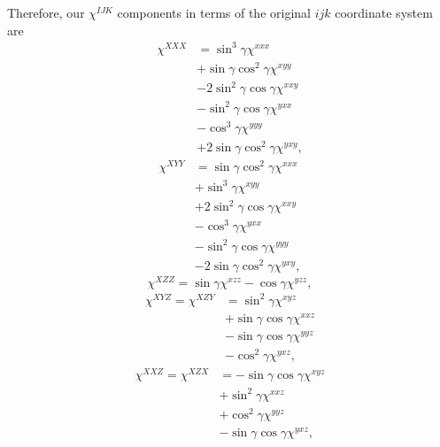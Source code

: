 \documentclass[aps,pra,10pt,amsmath,twocolumn,letterpaper]{revtex4-1}
\begin{document}
Therefore, our $\chi^{IJK}$ components in terms of the original $ijk$ coordinate
system are
\begin{equation*}
\begin{split}
\chi^{XXX} 
&=  \sin^{3}\gamma            \chi^{xxx}\\
&+  \sin\gamma \cos^{2}\gamma \chi^{xyy}\\
&- 2\sin^{2}\gamma \cos\gamma \chi^{xxy}\\
&-  \sin^{2}\gamma \cos\gamma \chi^{yxx}\\
&-  \cos^{3}\gamma            \chi^{yyy}\\
&+ 2\sin\gamma \cos^{2}\gamma \chi^{yxy},
\end{split}
\end{equation*}
\begin{equation*}
\begin{split}
\chi^{XYY} 
&=  \sin\gamma \cos^{2}\gamma \chi^{xxx}\\
&+  \sin^{3}\gamma            \chi^{xyy}\\
&+ 2\sin^{2}\gamma \cos\gamma \chi^{xxy}\\
&-  \cos^{3}\gamma            \chi^{yxx}\\
&-  \sin^{2}\gamma \cos\gamma \chi^{yyy}\\
&- 2\sin\gamma \cos^{2}\gamma \chi^{yxy},
\end{split}
\end{equation*}
\begin{equation*}
\chi^{XZZ} = \sin\gamma \chi^{xzz} - \cos\gamma \chi^{yzz},
\end{equation*}
\begin{equation*}
\begin{split}
\chi^{XYZ} = \chi^{XZY}
&= \sin^{2}\gamma        \chi^{xyz}\\
&+ \sin\gamma \cos\gamma \chi^{xxz}\\
&- \sin\gamma \cos\gamma \chi^{yyz}\\
&- \cos^{2}\gamma        \chi^{yxz},
\end{split}
\end{equation*}
\begin{equation*}
\begin{split}
\chi^{XXZ} = \chi^{XZX}
&=
 - \sin\gamma \cos\gamma \chi^{xyz}\\
&+ \sin^{2}\gamma        \chi^{xxz}\\
&+ \cos^{2}\gamma        \chi^{yyz}\\
&- \sin\gamma \cos\gamma \chi^{yxz},
\end{split}
\end{equation*}
\end{document}
